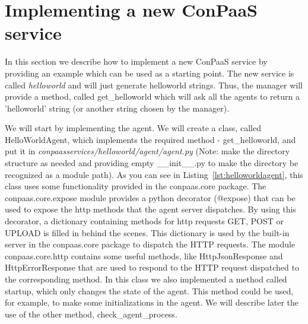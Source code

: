 \documentclass[10pt]{article}
\begin{document}
\begin{itemize}

\end{itemize}

\section{Implementing a new ConPaaS service}

In this section we describe how to implement a new ConPaaS service by providing an example which can be used as a starting point. The new service is called \textit{helloworld} and will just generate helloworld strings. Thus, the manager will provide a method, called get\_helloworld which will ask all the agents to return a 'helloworld' string (or another string chosen by the manager). 

We will start by implementing the agent. We will create a class, called HelloWorldAgent, which implements the required method - get\_helloworld, and put it in \textit{conpaasservices/helloworld/agent/agent.py} (Note: make the directory structure as needed and providing empty \_\_init\_\_.py to make the directory be recognized as a module path). As you can see in Listing~\ref{lst:helloworldagent}, this class uses some functionality provided in the conpaas.core package. The conpaas.core.expose module provides a python decorator (@expose) that can be used to expose the http methods that the agent server dispatches. By using this decorator, a dictionary containing methods for http requests GET, POST or UPLOAD is filled in behind the scenes. This dictionary is used by the built-in server in the conpaas.core package to dispatch the HTTP requests. The module conpaas.core.http contains some useful methods, like HttpJsonResponse and HttpErrorResponse that are used to respond to the HTTP request dispatched to the corresponding method. In this class we also implemented a method called startup, which only changes the state of the agent. This method could be used, for example, to make some initializations in the agent. We will describe later the use of the other method, check\_agent\_process.
\end{document}
